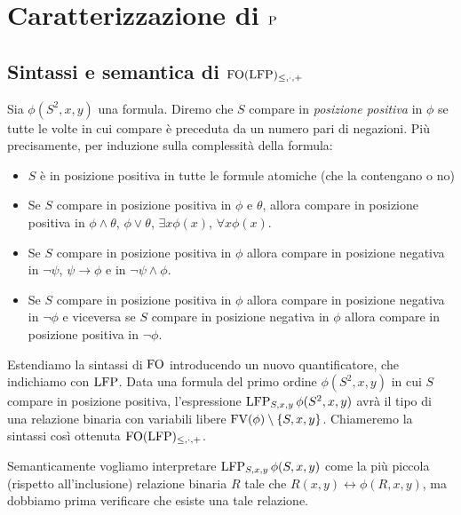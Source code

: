 \chapter{Caratterizzazione di \texorpdfstring{$\P$}{P}}

\section{Sintassi e semantica di \texorpdfstring{$\FOLFP$}{FO(LFP)}}

\begin{definizione}
 Sia $\phi(S^2,x,y)$ una formula.
 Diremo che $S$ compare in \emph{posizione positiva} in $\phi$ se tutte le volte
 in cui compare è preceduta da un
 numero pari di negazioni. Più precisamente, per induzione sulla complessità
 della formula:
 \begin{itemize}
  \item $S$ è in posizione positiva in tutte le formule atomiche (che la contengano o no)
  \item Se $S$ compare in posizione positiva in $\phi$ e $\theta$, allora compare
  in posizione positiva in $\phi \land \theta$, $\phi \lor \theta$, $\exists x \phi(x)$,
  $\forall x \phi(x)$.
  \item Se $S$ compare in posizione positiva in $\phi$ allora compare in posizione
  negativa in $\lnot \psi$, $\psi \to \phi$ e in $\lnot \psi \land \phi$.
  \item Se $S$ compare in posizione positiva in $\phi$ allora compare in posizione
  negativa in $\lnot \phi$ e viceversa se $S$ compare in posizione negativa in $\phi$
  allora compare in posizione
  positiva in $\lnot \phi$.
 \end{itemize}
\end{definizione}

\begin{definizione}
 Estendiamo la sintassi di $\FO$ introducendo un nuovo quantificatore, che
 indichiamo con $\LFP$. Data una
 formula del primo ordine $\phi(S^2,x,y)$ in cui $S$ compare in posizione positiva,
 l'espressione $\LFP_{S,x,y} \phi(S^2,x,y)$ avrà il tipo di una relazione binaria
 con variabili
 libere $\FV(\phi) \setminus \{S,x,y\}$.
 Chiameremo la sintassi così ottenuta $\FOLFP$.
\end{definizione}

Semanticamente vogliamo interpretare $\LFP_{S,x,y} \phi(S,x,y)$ come la più
piccola (rispetto all'inclusione) relazione binaria $R$ tale che $R(x,y) \leftrightarrow \phi(R,x,y)$, ma dobbiamo
prima verificare che esiste una tale relazione.


